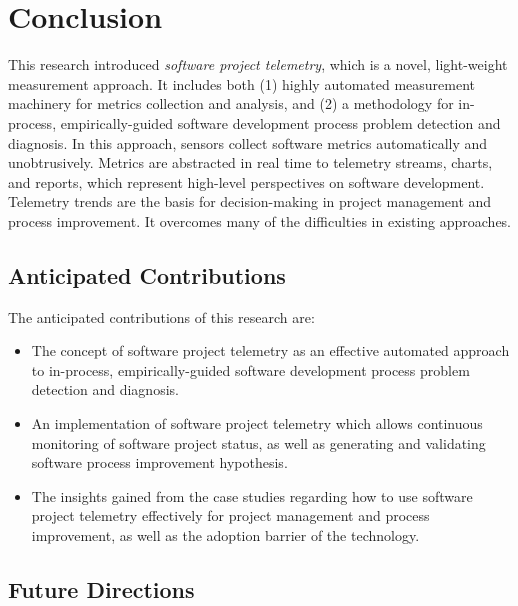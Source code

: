 \chapter{Conclusion}  \label{Chapter:Conclusion}


This research introduced \textit{software project telemetry}, which is a novel, light-weight measurement approach. It includes both (1) highly automated measurement machinery for metrics collection and analysis, and (2) a methodology for in-process, empirically-guided software development process problem detection and diagnosis. In this approach, sensors collect software metrics automatically and unobtrusively. Metrics are abstracted in real time to telemetry streams, charts, and reports, which represent high-level perspectives on software development. Telemetry trends are the basis for decision-making in project management and process improvement. It overcomes many of the difficulties in existing approaches.



\section{Anticipated Contributions}

The anticipated contributions of this research are:

\begin{itemize}
	\item The concept of software project telemetry as an effective automated approach to in-process, empirically-guided software development process problem detection and diagnosis. 
  
  \item An implementation of software project telemetry which allows continuous monitoring of software project status, as well as generating and validating software process improvement hypothesis.
  
  \item The insights gained from the case studies regarding how to use software project telemetry effectively for project management and process improvement, as well as the adoption barrier of the technology.

\end{itemize}





\section{Future Directions}

